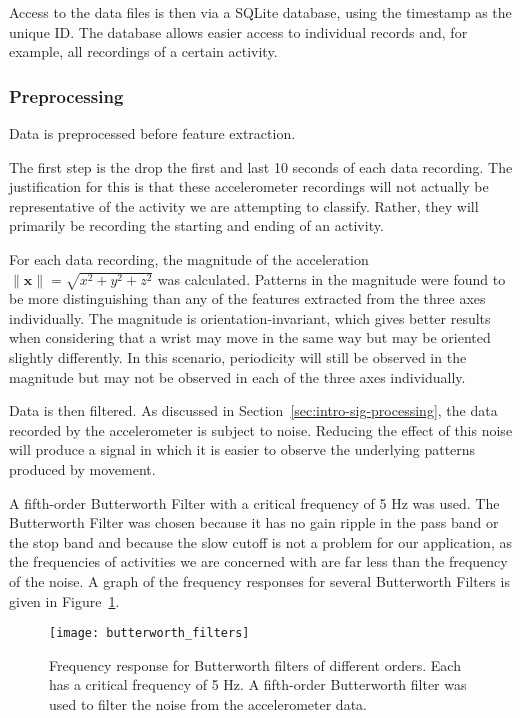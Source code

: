         Access to the data files is then via a SQLite database, using the timestamp as the unique ID. The database allows easier access to individual records and, for example, all recordings of a certain activity.
      \subsubsection{Preprocessing}
        \label{sec:preprocessing}
        Data is preprocessed before feature extraction.
        
        The first step is the drop the first and last 10 seconds of each data recording. The justification for this is that these accelerometer recordings will not actually be representative of the activity we are attempting to classify. Rather, they will primarily be recording the starting and ending of an activity.
        
        For each data recording, the magnitude of the acceleration $\|\mathbf{x}\| = \sqrt{x^2+y^2+z^2}$ was calculated. Patterns in the magnitude were found to be more distinguishing than any of the features extracted from the three axes individually. The magnitude is orientation-invariant, which gives better results when considering that a wrist may move in the same way but may be oriented slightly differently. In this scenario, periodicity will still be observed in the magnitude but may not be observed in each of the three axes individually.
        
        Data is then filtered. As discussed in Section~\ref{sec:intro-sig-processing}, the data recorded by the accelerometer is subject to noise. Reducing the effect of this noise will produce a signal in which it is easier to observe the underlying patterns produced by movement.
        
        A fifth-order Butterworth Filter with a critical frequency of 5 \si{Hz} was used. The Butterworth Filter was chosen because it has no gain ripple in the pass band or the stop band and because the slow cutoff is not a problem for our application, as the frequencies of activities we are concerned with are far less than the frequency of the noise. A graph of the frequency responses for several Butterworth Filters is given in Figure~\ref{fig:butterworth_filters}.
        
        \begin{figure}
          \centering
          \texttt{[image: butterworth\_filters]}
          \caption{Frequency response for Butterworth filters of different orders. Each has a critical frequency of 5 \si{Hz}. A fifth-order Butterworth filter was used to filter the noise from the accelerometer data.}
          \label{fig:butterworth_filters}
        \end{figure}
        
